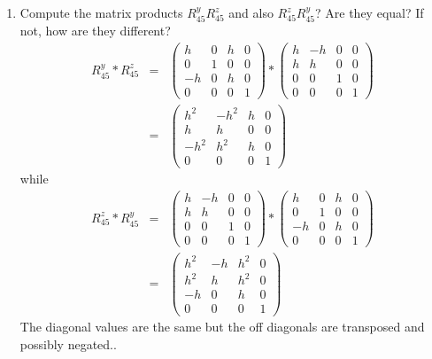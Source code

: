\documentclass{book}
\begin{document}
\begin{enumerate}
\item Compute the matrix products $R^y_{45} R^z_{45}$ and also $R^z_{45} R^y_{45}$? Are they equal? If not, how are they different?
\begin{eqnarray*}
R^y_{45} * R^z_{45} &=&
\left (
\begin{array}{cccc}
 h & 0 & h & 0 \\
 0 & 1 & 0 & 0 \\
-h & 0 & h & 0 \\
 0 & 0 & 0 & 1
\end{array}
\right )
*
\left (
\begin{array}{cccc}
h & -h & 0 & 0 \\
h & h & 0 & 0 \\
0 & 0 & 1 & 0 \\
0 & 0 & 0 & 1
\end{array}
\right ) \\
&=&
\left (
\begin{array}{cccc}
h^2 & -h^2 & h & 0 \\
h & h & 0 & 0 \\
-h^2 & h^2 & h & 0 \\
0 & 0 & 0 & 1
\end{array}
\right )
\end{eqnarray*}
while
\begin{eqnarray*}
R^z_{45} * R^y_{45}
&=&
\left (
\begin{array}{cccc}
h & -h & 0 & 0 \\
h & h & 0 & 0 \\
0 & 0 & 1 & 0 \\
0 & 0 & 0 & 1
\end{array}
\right )
*
\left (
\begin{array}{cccc}
 h & 0 & h & 0 \\
 0 & 1 & 0 & 0 \\
-h & 0 & h & 0 \\
 0 & 0 & 0 & 1
\end{array}
\right ) \\
&=&
\left (
\begin{array}{cccc}
h^2 & -h & h^2 & 0 \\
h^2 & h & h^2 & 0 \\
-h & 0 & h & 0 \\
0 & 0 & 0 & 1
\end{array}
\right )
\end{eqnarray*}
The diagonal values are the same but the off diagonals are transposed and possibly negated..


\end{enumerate}
\end{document}
